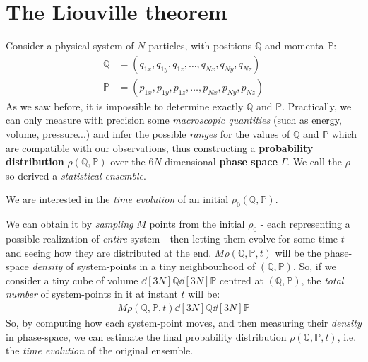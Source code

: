 \documentclass[../template.tex]{subfiles}
\begin{document}
\section{The Liouville theorem}

Consider a physical system of $N$ particles, with positions $\mathbb{Q}$ and momenta $\mathbb{P}$:
\begin{align*}
    \mathbb{Q} &= (q_{1x}, q_{1y}, q_{1z}, \dots, q_{Nx}, q_{Ny}, q_{Nz})\\
    \mathbb{P} &= (p_{1x}, p_{1y}, p_{1z}, \dots, p_{Nx}, p_{Ny}, p_{Nz})
\end{align*} 
As we saw before, it is impossible to determine exactly $\mathbb{Q}$ and $\mathbb{P}$. Practically, we can only measure with precision some \textit{macroscopic quantities} (such as energy, volume, pressure...) and infer the possible \textit{ranges} for the values of $\mathbb{Q}$ and $\mathbb{P}$ which are compatible with our observations, thus constructing a \textbf{probability distribution} $\rho(\mathbb{Q},\mathbb{P})$ over the $6N$-dimensional \textbf{phase space} $\Gamma$. We call the $\rho$ so derived a \textit{statistical ensemble}. 

\medskip

We are interested in the \textit{time evolution} of an initial $\rho_0(\mathbb{Q},\mathbb{P})$. 

We can obtain it by \textit{sampling} $M$ points from the initial $\rho_0$ - each representing a possible realization of \textit{entire} system
- then letting them evolve for some time $t$ and seeing how they are distributed at the end. $M \rho(\mathbb{Q},\mathbb{P},t)$ will be the phase-space \textit{density} of system-points in a tiny neighbourhood of $(\mathbb{Q},\mathbb{P})$. So, if we consider a tiny cube of volume $\dd[3N]{\mathbb{Q}} \dd[3N]{\mathbb{P}}$ centred at $(\mathbb{Q},\mathbb{P})$, the \textit{total number} of system-points in it at instant $t$ will be:
\begin{align*}
    M \rho(\mathbb{Q},\mathbb{P},t) \dd[3N]{\mathbb{Q}} \dd[3N]{\mathbb{P}}
\end{align*} 
So, by computing how each system-point moves, and then measuring their \textit{density} in phase-space, we can estimate the final probability distribution $\rho(\mathbb{Q},\mathbb{P},t)$, i.e. the \textit{time evolution} of the original ensemble. 
\end{document}
